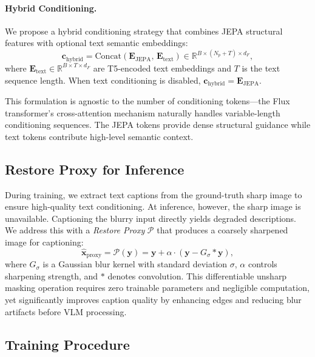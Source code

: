 \documentclass{article}
\begin{document}
\paragraph{Hybrid Conditioning.}
We propose a hybrid conditioning strategy that combines JEPA structural features with optional text semantic embeddings:
\begin{equation}
    \mathbf{c}_{\text{hybrid}} = \text{Concat}\left(\mathbf{E}_{\text{JEPA}},\, \mathbf{E}_{\text{text}}\right) \in \mathbb{R}^{B \times (N_p + T) \times d_F},
    \label{eq:hybrid}
\end{equation}
where $\mathbf{E}_{\text{text}} \in \mathbb{R}^{B \times T \times d_F}$ are T5-encoded text embeddings and $T$ is the text sequence length. When text conditioning is disabled, $\mathbf{c}_{\text{hybrid}} = \mathbf{E}_{\text{JEPA}}$.

This formulation is agnostic to the number of conditioning tokens---the Flux transformer's cross-attention mechanism naturally handles variable-length conditioning sequences. The JEPA tokens provide dense structural guidance while text tokens contribute high-level semantic context.

\subsection{Restore Proxy for Inference}
\label{sec:proxy}

During training, we extract text captions from the ground-truth sharp image to ensure high-quality text conditioning. At inference, however, the sharp image is unavailable. Captioning the blurry input directly yields degraded descriptions. We address this with a \emph{Restore Proxy} $\mathcal{P}$ that produces a coarsely sharpened image for captioning:
\begin{equation}
    \hat{\mathbf{x}}_{\text{proxy}} = \mathcal{P}(\mathbf{y}) = \mathbf{y} + \alpha \cdot \left(\mathbf{y} - G_\sigma * \mathbf{y}\right),
    \label{eq:proxy}
\end{equation}
where $G_\sigma$ is a Gaussian blur kernel with standard deviation $\sigma$, $\alpha$ controls sharpening strength, and $*$ denotes convolution. This differentiable unsharp masking operation requires zero trainable parameters and negligible computation, yet significantly improves caption quality by enhancing edges and reducing blur artifacts before VLM processing.

\subsection{Training Procedure}
\label{sec:training}
\end{document}
